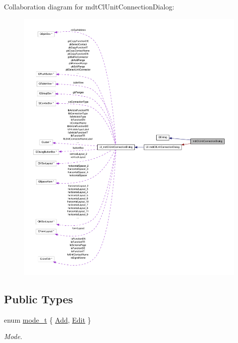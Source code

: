 Collaboration diagram for mdt\-Cl\-Unit\-Connection\-Dialog\-:\nopagebreak
\begin{figure}[H]
\begin{center}
\leavevmode
\includegraphics[width=350pt]{classmdt_cl_unit_connection_dialog__coll__graph}
\end{center}
\end{figure}
\subsection*{Public Types}
\begin{DoxyCompactItemize}
\item 
enum \hyperlink{classmdt_cl_unit_connection_dialog_a754889f1591eddb79b69de4c51532f43}{mode\-\_\-t} \{ \hyperlink{classmdt_cl_unit_connection_dialog_a754889f1591eddb79b69de4c51532f43a65365660e45940b053efbf543aa2c10c}{Add}, 
\hyperlink{classmdt_cl_unit_connection_dialog_a754889f1591eddb79b69de4c51532f43a855eaf8093ea6043e46688cc5115643f}{Edit}
 \}
\begin{DoxyCompactList}\small\item\em Mode. \end{DoxyCompactList}\end{DoxyCompactItemize}
